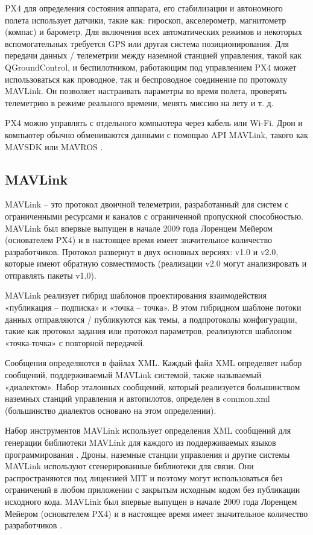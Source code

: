 PX4 для определения состояния аппарата, его стабилизации и автономного полета использует датчики, такие как: гироскоп, акселерометр, магнитометр (компас) и барометр. Для включения всех автоматических режимов и некоторых вспомогательных требуется GPS или другая система позиционирования.
Для передачи данных / телеметрии между наземной станцией управления, такой как Q\-Ground\-Control, и беспилотником, работающим под управлением PX4 может использоваться как проводное, так и беспроводное соединение по протоколу MAVLink. Он позволяет настраивать параметры во время полета, проверять телеметрию в режиме реального времени, менять миссию на лету и т. д.

PX4 можно управлять с отдельного компьютера через кабель или Wi-Fi. Дрон и компьютер обычно обмениваются данными с помощью API MAVLink, такого как MAVSDK или MAVROS \cite{px4}.

\subsection{MAVLink}


MAVLink -- это протокол двоичной телеметрии, разработанный для систем с ограниченными ресурсами и каналов с ограниченной пропускной способностью. MAVLink был впервые выпущен в начале 2009 года Лоренцем Мейером (основателем PX4) и в настоящее время имеет значительное количество разработчиков. Протокол развернут в двух основных версиях: v1.0 и v2.0, которые имеют обратную совместимость (реализации v2.0 могут анализировать и отправлять пакеты v1.0).

MAVLink реализует гибрид шаблонов проектирования взаимодействия «публикация -- подписка» и «точка -- точка». В этом гибридном шаблоне потоки данных отправляются / публикуются как темы, а подпротоколы конфигурации, такие как протокол задания или протокол параметров, реализуются шаблоном «точка-точка» с повторной передачей.

Сообщения определяются в файлах XML. Каждый файл XML определяет набор сообщений, поддерживаемый MAVLink системой, также называемый «диалектом». Набор эталонных сообщений, который реализуется большинством наземных станций управления и автопилотов, определен в common.xml (большинство диалектов основано на этом определении).

Набор инструментов MAVLink использует определения XML сообщений для генерации библиотеки MAVLink для каждого из поддерживаемых языков программирования . Дроны, наземные станции управления и другие системы MAVLink используют сгенерированные библиотеки для связи. Они распространяются под лицензией MIT и поэтому могут использоваться без ограничений в любом приложении с закрытым исходным кодом без публикации исходного кода. MAVLink был впервые выпущен в начале 2009 года Лоренцем Мейером (основателем PX4) и в настоящее время имеет значительное количество разработчиков \cite{px}.

